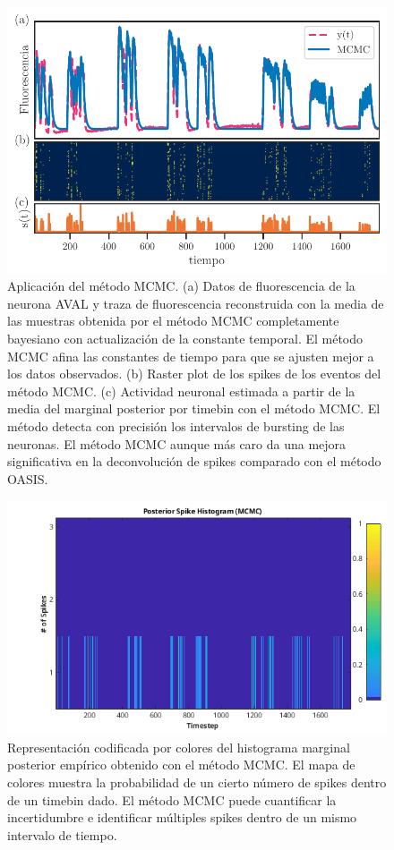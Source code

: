  
 

    \begin{figure}[h!]
	\centering{}\includegraphics[width=\imsize]{MCMC.pdf}
	\caption[Aplicación del método MCMC.]{Aplicación del método MCMC. (a)  Datos de fluorescencia  de la neurona AVAL  y traza de fluorescencia reconstruida con  la  media de las muestras obtenida por el método MCMC completamente bayesiano con actualización de la constante temporal. El método MCMC  afina las constantes de tiempo para que se ajusten mejor a los datos observados.  (b)  Raster plot de los spikes de los  eventos del método MCMC. (c)  Actividad neuronal estimada  a partir de la media del marginal posterior por timebin con el método MCMC.  El método detecta con precisión los intervalos de bursting de las neuronas.  El método MCMC aunque más caro da una mejora significativa en la deconvolución de spikes comparado con el método OASIS. }\label{f:MCMC}  
\end{figure}


    \begin{figure}[h!]
	\centering{}\includegraphics[width=\imsize]{mcmc.png}
	\caption[Aplicación del método MCMC.]{Representación codificada por colores del histograma marginal posterior empírico obtenido con el método MCMC. El mapa de colores muestra la probabilidad de un cierto número de spikes dentro de un timebin dado. El método MCMC puede cuantificar la incertidumbre e identificar múltiples spikes dentro de un mismo intervalo de tiempo.}\label{f:mcmc}  
\end{figure}

